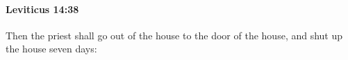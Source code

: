 
		\paragraph{Leviticus 14:38} %
			\label{LEVITICUS-14-38}

			Then the priest shall go out of the house to the door of the house, and shut up the house seven days:


